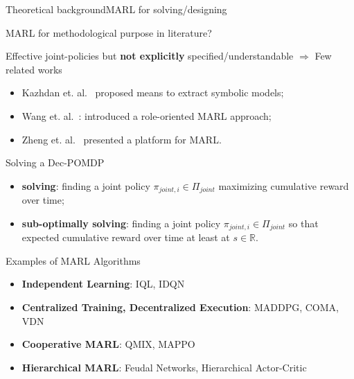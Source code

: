 \begin{frame}{Theoretical background}{MARL for solving/designing}

    \begin{block}{MARL for methodological purpose in literature?}

        Effective joint-policies but \textbf{not explicitly} specified/understandable
        $\Longrightarrow$ Few related works
            {\small
                \begin{itemize}
                    \item Kazhdan et. al.~\cite{Kazhdan2020} proposed means to extract symbolic models;
                    \item Wang et. al.~\cite{Wang2020}: introduced a role-oriented MARL approach;
                    \item Zheng et. al.~\cite{Zheng2018} presented a platform for MARL.
                \end{itemize}
            }
    \end{block}

    \begin{block}{Solving a Dec-POMDP}
        \begin{itemize}
            \item \textbf{solving}: finding a joint policy $\pi_{joint,i} \in \Pi_{joint}$ maximizing cumulative reward over time;
            \item \textbf{sub-optimally solving}: finding a joint policy $\pi_{joint,i} \in \Pi_{joint}$ so that expected cumulative reward over time at least at $s \in \mathbb{R}$.
        \end{itemize}
    \end{block}

    \begin{exampleblock}{Examples of MARL Algorithms}
        {\footnotesize

            \centering
            \begin{minipage}{0.5\textwidth}
                \centering
                \begin{itemize}
                    \item \textbf{Independent Learning}: IQL, IDQN
                    \item \textbf{Centralized Training, Decentralized Execution}: MADDPG, COMA, VDN
                \end{itemize}
            \end{minipage}\hfill
            \begin{minipage}{0.5\textwidth}
                \centering
                \begin{itemize}
                    \item \textbf{Cooperative MARL}: QMIX, MAPPO
                    \item \textbf{Hierarchical MARL}: Feudal Networks, Hierarchical Actor-Critic
                \end{itemize}
            \end{minipage}\hfill
        }
    \end{exampleblock}

\end{frame}
